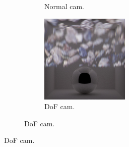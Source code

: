 \begin{figure}[]
\begin{subfigure}{\textwidth}
\begin{subfigure}{0.32\textwidth}
            \caption{Normal cam.}
            \label{fig:ex03-dof-normal_normal_proj}
        \end{subfigure}
        \hfill
        \begin{subfigure}{0.32\textwidth}
            \centering
            \includegraphics[width=\textwidth]{images/04-experiment03/dof/normal_on_dof.jpg}
            \caption{DoF cam.}
            \label{fig:ex03-dof-normal_dof_proj}
        \end{subfigure}
        

\end{subfigure}
\end{figure}
